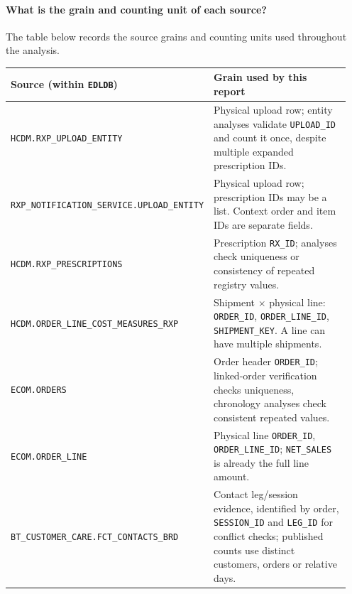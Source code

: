 \paragraph{What is the grain and counting unit of each source?}
The table below records the source grains and counting units used throughout the analysis.

\begin{longtable}{@{}>{\raggedright\arraybackslash}p{0.36\linewidth}>{\raggedright\arraybackslash}p{0.59\linewidth}@{}}
\toprule
Source (within \texttt{EDLDB}) & Grain used by this report \\
\midrule
\endhead

\texttt{HCDM.RXP\_UPLOAD\_ENTITY} & Physical upload row; entity analyses validate \texttt{UPLOAD\_ID} and count it once, despite multiple expanded prescription IDs. \\

\texttt{RXP\_NOTIFICATION\_SERVICE.}\allowbreak\texttt{UPLOAD\_ENTITY} & Physical upload row; prescription IDs may be a list. Context order and item IDs are separate fields. \\

\texttt{HCDM.RXP\_PRESCRIPTIONS} & Prescription \texttt{RX\_ID}; analyses check uniqueness or consistency of repeated registry values. \\

\texttt{HCDM.ORDER\_LINE\_COST\_}\allowbreak\texttt{MEASURES\_RXP} & Shipment $\times$ physical line: \texttt{ORDER\_ID}, \texttt{ORDER\_LINE\_ID}, \texttt{SHIPMENT\_KEY}. A line can have multiple shipments. \\

\texttt{ECOM.ORDERS} & Order header \texttt{ORDER\_ID}; linked-order verification checks uniqueness, chronology analyses check consistent repeated values. \\

\texttt{ECOM.ORDER\_LINE} & Physical line \texttt{ORDER\_ID}, \texttt{ORDER\_LINE\_ID}; \texttt{NET\_SALES} is already the full line amount. \\

\texttt{BT\_CUSTOMER\_CARE.}\allowbreak\texttt{FCT\_CONTACTS\_BRD} & Contact leg/session evidence, identified by order, \texttt{SESSION\_ID} and \texttt{LEG\_ID} for conflict checks; published counts use distinct customers, orders or relative days. \\
\bottomrule
\end{longtable}
